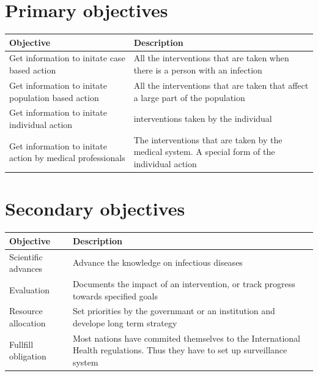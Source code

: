 \documentclass[
  letterpaper,
  DIV=11,
  numbers=noendperiod]{scrreprt}
\begin{document}
\section{Primary objectives}\label{primary-objectives}

\begin{longtable}[]{@{}
  >{\raggedright\arraybackslash}p{}
  >{\raggedright\arraybackslash}p{}@{}}
\toprule\noalign{}
\begin{minipage}[b]{\linewidth}\raggedright
Objective
\end{minipage} & \begin{minipage}[b]{\linewidth}\raggedright
Description
\end{minipage} \\
\midrule\noalign{}
\endhead
\bottomrule\noalign{}
\endlastfoot
Get information to initate case based action & All the interventions
that are taken when there is a person with an infection \\
Get information to initate population based action & All the
interventions that are taken that affect a large part of the
population \\
Get information to initate individual action & interventions taken by
the individual \\
Get information to initate action by medical professionals & The
interventions that are taken by the medical system. A special form of
the individual action \\
\end{longtable}

\section{Secondary objectives}\label{secondary-objectives}

\begin{longtable}[]{@{}
  >{\raggedright\arraybackslash}p{}
  >{\raggedright\arraybackslash}p{}@{}}
\toprule\noalign{}
\begin{minipage}[b]{\linewidth}\raggedright
Objective
\end{minipage} & \begin{minipage}[b]{\linewidth}\raggedright
Description
\end{minipage} \\
\midrule\noalign{}
\endhead
\bottomrule\noalign{}
\endlastfoot
Scientific advances & Advance the knowledge on infectious diseases \\
Evaluation & Documents the impact of an intervention, or track progress
towards specified goals \\
Resource allocation & Set priorities by the governmant or an institution
and develope long term strategy \\
Fullfill obligation & Most nations have commited themselves to the
International Health regulations. Thus they have to set up surveillance
system \\
\end{longtable}
\end{document}
